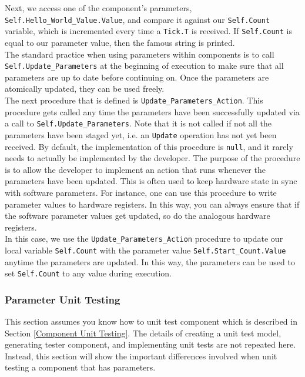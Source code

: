 Next, we access one of the component's parameters, \texttt{Self.Hello\_World\_Value.Value}, and compare it against our \texttt{Self.Count} variable, which is incremented every time a \texttt{Tick.T} is received. If \texttt{Self.Count} is equal to our parameter value, then the famous string is printed. \\

The standard practice when using parameters within components is to call \texttt{Self.Update\_Parameters} at the beginning of execution to make sure that all parameters are up to date before continuing on. Once the parameters are atomically updated, they can be used freely. \\

The next procedure that is defined is \texttt{Update\_Parameters\_Action}. This procedure gets called any time the parameters have been successfully updated via a call to \texttt{Self.Update\_Parameters}. Note that it is not called if not all the parameters have been staged yet, i.e. an \texttt{Update} operation has not yet been received. By default, the implementation of this procedure is \texttt{null}, and it rarely needs to actually be implemented by the developer. The purpose of the procedure is to allow the developer to implement an action that runs whenever the parameters have been updated. This is often used to keep hardware state in sync with software parameters. For instance, one can use this procedure to write parameter values to hardware registers. In this way, you can always ensure that if the software parameter values get updated, so do the analogous hardware registers. \\

In this case, we use the \texttt{Update\_Parameters\_Action} procedure to update our local variable \texttt{Self.Count} with the parameter value \texttt{Self.Start\_Count.Value} anytime the parameters are updated. In this way, the parameters can be used to set \texttt{Self.Count} to any value during execution.

\subsubsection{Parameter Unit Testing} \label{Parameter Unit Testing}

This section assumes you know how to unit test component which is described in Section \ref{Component Unit Testing}. The details of creating a unit test model, generating tester component, and implementing unit tests are not repeated here. Instead, this section will show the important differences involved when unit testing a component that has parameters. \\

